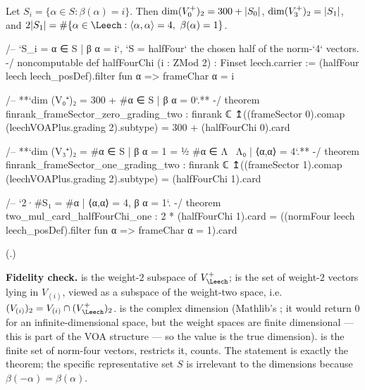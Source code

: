 \begin{theorem}\label{ch11:thm:wt2S}
Let $S_i=\{\alpha\in S : \beta(\alpha)=i\}$.  Then $\dim(V_0^{+})_2=300+|S_0|$,
$\dim(V_3^{+})_2=|S_1|$, and $2|S_1|=\#\{\alpha\in\Leech:\langle\alpha,\alpha\rangle=4,\ \beta(\alpha)=1\}$.
\end{theorem}
\begin{leancode}
/-- `S_i = {α ∈ S | β α = i}`, `S = halfFour` the chosen half of the norm-`4` vectors. -/
noncomputable def halfFourChi (i : ZMod 2) : Finset leech.carrier :=
  (halfFour leech leech_posDef).filter fun α => frameChar α = i

/-- **`dim (V₀⁺)₂ = 300 + #{α ∈ S | β α = 0}`.** -/
theorem finrank_frameSector_zero_grading_two :
    finrank ℂ ↥((frameSector 0).comap (leechVOAPlus.grading 2).subtype)
      = 300 + (halfFourChi 0).card

/-- **`dim (V₃⁺)₂ = #{α ∈ S | β α = 1} = ½ #{α ∈ Λ \ Λ₀ | ⟨α,α⟩ = 4}`.** -/
theorem finrank_frameSector_one_grading_two :
    finrank ℂ ↥((frameSector 1).comap (leechVOAPlus.grading 2).subtype)
      = (halfFourChi 1).card

/-- `2·#S₁ = #{α | ⟨α,α⟩ = 4, β α = 1}`. -/
theorem two_mul_card_halfFourChi_one :
    2 * (halfFourChi 1).card
      = ((normFour leech leech_posDef).filter fun α => frameChar α = 1).card
\end{leancode}
(.)
\begin{dictionary}
\textbf{Fidelity check.}   is the weight-$2$ subspace of $V_\Leech^+$;
 is the set of weight-$2$ vectors lying in
$V_{(i)}$, viewed as a subspace of the weight-two space, i.e.\ $(V_{(i)})_2=V_{(i)}\cap(V_\Leech^+)_2$.
 is the complex dimension (Mathlib's ; it would return $0$ for
an infinite-dimensional space, but the weight spaces are finite dimensional --- this is part of the
VOA structure --- so the value is the true dimension).   is the
finite set of norm-four vectors,  restricts it,  counts.  The
statement is exactly the theorem; the specific representative set $S$ is irrelevant to the
dimensions because $\beta(-\alpha)=\beta(\alpha)$.
\end{dictionary}

